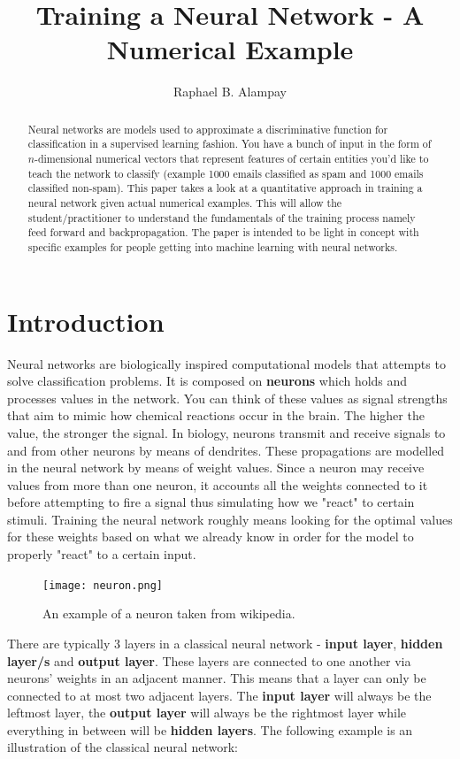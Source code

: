 \documentclass[a4paper]{article}
\title{Training a Neural Network - A Numerical Example}
\author{Raphael B. Alampay}
\begin{document}
\maketitle

\begin{abstract}
Neural networks are models used to approximate a discriminative function for classification in a supervised learning fashion. You have a bunch of input in the form of $n$-dimensional numerical vectors that represent features of certain entities you'd like to teach the network to classify (example 1000 emails classified as spam and 1000 emails classified non-spam). This paper takes a look at a quantitative approach in training a neural network given actual numerical examples. This will allow the student/practitioner to understand the fundamentals of the training process namely feed forward and backpropagation. The paper is intended to be light in concept with specific examples for people getting into machine learning with neural networks.
\end{abstract}

\section{Introduction}
Neural networks are biologically inspired computational models that attempts to solve classification problems. It is composed on \textbf{neurons} which holds and processes values in the network. You can think of these values as signal strengths that aim to mimic how chemical reactions occur in the brain. The higher the value, the stronger the signal. In biology, neurons transmit and receive signals to and from other neurons by means of dendrites. These propagations are modelled in the neural network by means of weight values. Since a neuron may receive values from more than one neuron, it accounts all the weights connected to it before attempting to fire a signal thus simulating how we "react" to certain stimuli. Training the neural network roughly means looking for the optimal values for these weights based on what we already know in order for the model to properly "react" to a certain input.

\begin{figure}[!htb]
\centering
\texttt{[image: neuron.png]}
\caption{\label{fig:neuron}An example of a neuron taken from wikipedia.}
\end{figure}

There are typically 3 layers in a classical neural network - \textbf{input layer}, \textbf{hidden layer/s} and \textbf{output layer}. These layers are connected to one another via neurons' weights in an adjacent manner. This means that a layer can only be connected to at most two adjacent layers. The \textbf{input layer} will always be the leftmost layer, the \textbf{output layer} will always be the rightmost layer while everything in between will be \textbf{hidden layers}. The following example is an illustration of the classical neural network:
\end{document}
